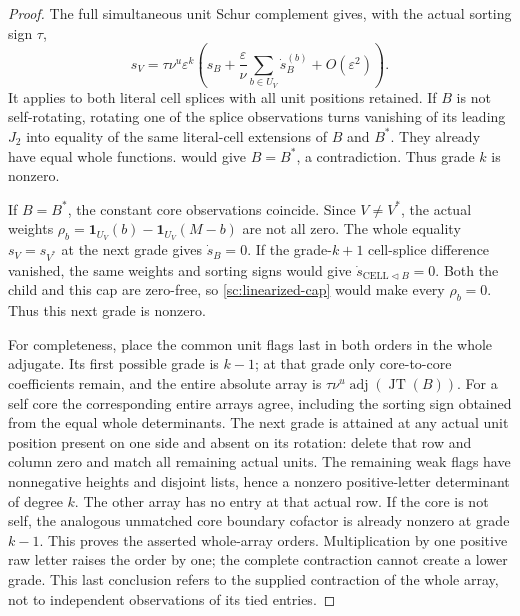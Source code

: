 \documentclass[11pt,a4paper]{amsart}
\numberwithin{equation}{section}
\theoremstyle{plain}
\theoremstyle{definition}
\begin{document}
\begin{proof}
The full simultaneous unit Schur complement gives, with the actual
sorting sign \(\tau\),
\begin{equation}\label{sc:whole-unit-series}
 s_V=\tau\nu^u\varepsilon^k
 \left(s_B+\frac\varepsilon\nu
            \sum_{b\in U_V}\dot s_B^{(b)}+O(\varepsilon^2)\right).
\end{equation}
It applies to both literal cell splices with all unit positions retained.
If \(B\) is not self-rotating, rotating one of the splice observations
turns vanishing of its leading \(J_2\) into equality of the same
literal-cell extensions of \(B\) and \(B^*\).  They already have equal
whole functions.   would give \(B=B^*\), a
contradiction.  Thus grade \(k\) is nonzero.

If \(B=B^*\), the constant core observations coincide.  Since \(V\ne V^*\),
the actual weights
\(\rho_b=\mathbf1_{U_V}(b)-\mathbf1_{U_V}(M-b)\) are not all zero.
The whole equality \(s_V=s_{V^*}\) at the next grade gives
\(\dot s_B=0\).  If the grade-\(k+1\) cell-splice difference vanished,
the same weights and sorting signs would give
\(\dot s_{\mathrm{CELL}\triangleleft B}=0\).
Both the child and this cap are zero-free, so
\cref{sc:linearized-cap} would make every \(\rho_b=0\).
Thus this next grade is nonzero.

For completeness, place the common unit flags last in both orders in
the whole adjugate.  Its first possible grade is \(k-1\); at that grade
only core-to-core coefficients remain, and the entire absolute array
is \(\tau\nu^u\operatorname{adj}(\operatorname{JT}(B))\).
For a self core the corresponding entire arrays agree, including the
sorting sign obtained from the equal whole determinants.  The next
grade is attained at any actual unit position present on one side and
absent on its rotation: delete that row and column zero and match all
remaining actual units.  The remaining weak flags have nonnegative
heights and disjoint lists, hence a nonzero positive-letter determinant
of degree \(k\).  The other array has no entry at that actual row.
If the core is not self, the analogous unmatched core boundary cofactor
is already nonzero at grade \(k-1\).
This proves the asserted whole-array orders.  Multiplication by one
positive raw letter raises the order by one; the complete contraction
cannot create a lower grade.  This last conclusion refers to the
supplied contraction of the whole array, not to independent observations
of its tied entries.
\end{proof}
\end{document}
